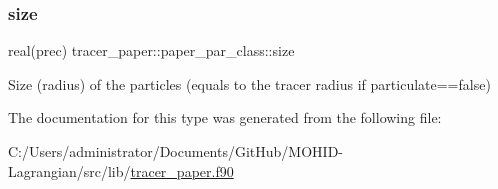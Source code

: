 \subsubsection{\texorpdfstring{size}{size}}
{\footnotesize\ttfamily real(prec) tracer\+\_\+paper\+::paper\+\_\+par\+\_\+class\+::size\hspace{0.3cm}{\ttfamily [private]}}



Size (radius) of the particles (equals to the tracer radius if particulate==false) 



The documentation for this type was generated from the following file\+:\begin{DoxyCompactItemize}
\item 
C\+:/\+Users/administrator/\+Documents/\+Git\+Hub/\+M\+O\+H\+I\+D-\/\+Lagrangian/src/lib/\hyperlink{tracer__paper_8f90}{tracer\+\_\+paper.\+f90}\end{DoxyCompactItemize}
